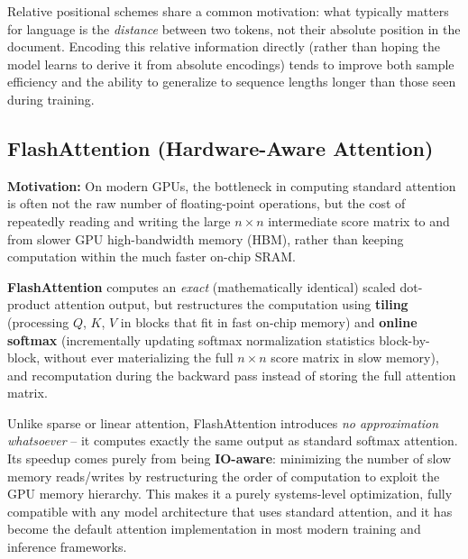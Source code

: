 \documentclass[11pt]{article}
\begin{document}
\begin{keyidea}
Relative positional schemes share a common motivation: what typically matters for language is the \emph{distance} between two tokens, not their absolute position in the document. Encoding this relative information directly (rather than hoping the model learns to derive it from absolute encodings) tends to improve both sample efficiency and the ability to generalize to sequence lengths longer than those seen during training.
\end{keyidea}

\subsection*{FlashAttention (Hardware-Aware Attention)}

\textbf{Motivation:} On modern GPUs, the bottleneck in computing standard attention is often not the raw number of floating-point operations, but the cost of repeatedly reading and writing the large $n\times n$ intermediate score matrix to and from slower GPU high-bandwidth memory (HBM), rather than keeping computation within the much faster on-chip SRAM.

\begin{defbox}
\textbf{FlashAttention} computes an \emph{exact} (mathematically identical) scaled dot-product attention output, but restructures the computation using \textbf{tiling} (processing $Q$, $K$, $V$ in blocks that fit in fast on-chip memory) and \textbf{online softmax} (incrementally updating softmax normalization statistics block-by-block, without ever materializing the full $n\times n$ score matrix in slow memory), and recomputation during the backward pass instead of storing the full attention matrix.
\end{defbox}

\begin{keyidea}
Unlike sparse or linear attention, FlashAttention introduces \emph{no approximation whatsoever} -- it computes exactly the same output as standard softmax attention. Its speedup comes purely from being \textbf{IO-aware}: minimizing the number of slow memory reads/writes by restructuring the order of computation to exploit the GPU memory hierarchy. This makes it a purely systems-level optimization, fully compatible with any model architecture that uses standard attention, and it has become the default attention implementation in most modern training and inference frameworks.
\end{keyidea}
\end{document}
